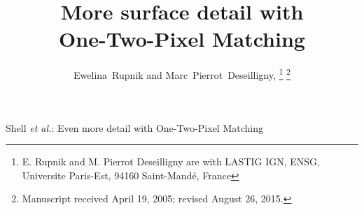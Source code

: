 \documentclass[journal]{IEEEtran}
\begin{document}
%
\title{More surface detail with\\ One-Two-Pixel Matching}
%
%

\author{Ewelina~Rupnik 
        and Marc~Pierrot~Deseilligny,%
\thanks{E. Rupnik and M. Pierrot Deseilligny are with LASTIG IGN, ENSG, Universite Paris-Est, 94160 Saint-Mandé, France}%
\thanks{Manuscript received April 19, 2005; revised August 26, 2015.}}

% 
%



%
{Shell \MakeLowercase{\textit{et al.}}: Even more detail with One-Two-Pixel Matching}
% 
\end{document}
